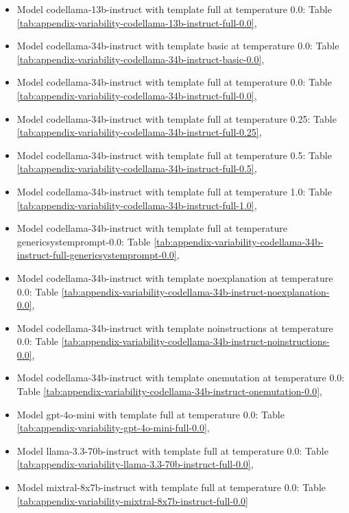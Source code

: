 \begin{itemize}
\item Model codellama-13b-instruct with template full at temperature 0.0: Table \ref{tab:appendix-variability-codellama-13b-instruct-full-0.0}, \item Model codellama-34b-instruct with template basic at temperature 0.0: Table \ref{tab:appendix-variability-codellama-34b-instruct-basic-0.0}, \item Model codellama-34b-instruct with template full at temperature 0.0: Table \ref{tab:appendix-variability-codellama-34b-instruct-full-0.0}, \item Model codellama-34b-instruct with template full at temperature 0.25: Table \ref{tab:appendix-variability-codellama-34b-instruct-full-0.25}, \item Model codellama-34b-instruct with template full at temperature 0.5: Table \ref{tab:appendix-variability-codellama-34b-instruct-full-0.5}, \item Model codellama-34b-instruct with template full at temperature 1.0: Table \ref{tab:appendix-variability-codellama-34b-instruct-full-1.0}, \item Model codellama-34b-instruct with template full at temperature genericsystemprompt-0.0: Table \ref{tab:appendix-variability-codellama-34b-instruct-full-genericsystemprompt-0.0}, \item Model codellama-34b-instruct with template noexplanation at temperature 0.0: Table \ref{tab:appendix-variability-codellama-34b-instruct-noexplanation-0.0}, \item Model codellama-34b-instruct with template noinstructions at temperature 0.0: Table \ref{tab:appendix-variability-codellama-34b-instruct-noinstructions-0.0}, \item Model codellama-34b-instruct with template onemutation at temperature 0.0: Table \ref{tab:appendix-variability-codellama-34b-instruct-onemutation-0.0}, \item Model gpt-4o-mini with template full at temperature 0.0: Table \ref{tab:appendix-variability-gpt-4o-mini-full-0.0}, \item Model llama-3.3-70b-instruct with template full at temperature 0.0: Table \ref{tab:appendix-variability-llama-3.3-70b-instruct-full-0.0}, \item Model mixtral-8x7b-instruct with template full at temperature 0.0: Table \ref{tab:appendix-variability-mixtral-8x7b-instruct-full-0.0}
\end{itemize}

